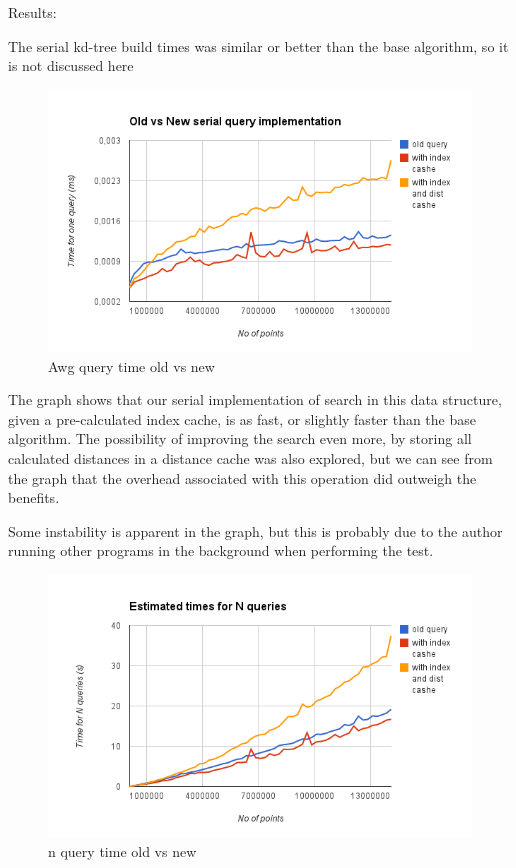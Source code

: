 Results:

The serial kd-tree build times was similar or better than the base algorithm, so it is not discussed here

\begin{figure}[ht!]
\centering
\includegraphics[width=120mm]{../gfx/awg-query-time-old-vs-new.png}

\caption{Awg query time old vs new}
\label{fig:awg_query_time_old_vs_new}
\end{figure}

The graph shows that our serial implementation of search in this data structure, given a pre-calculated index cache, is as fast, or slightly faster than the base algorithm. The possibility of improving the search even more, by storing all calculated distances in a distance cache was also explored, but we can see from the graph that the overhead associated with this operation did outweigh the benefits.

Some instability is apparent in the graph, but this is probably due to the author running other programs in the background when performing the test.

\begin{figure}[ht!]
\centering
\includegraphics[width=120mm]{../gfx/n-query-time-old-vs-new.png}

\caption{n query time old vs new}
\label{fig:n_query_time_old_vs_new}
\end{figure}

